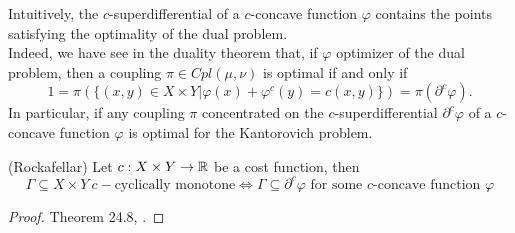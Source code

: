 \documentclass[../main.tex]{subfiles}
\begin{document}
\begin{remark}
    Intuitively, the $c$-superdifferential of a $c$-concave function $\varphi$ contains the points satisfying the optimality of the dual problem.\\Indeed, we have see in the duality theorem that, if $\varphi$ optimizer of the dual problem, then a coupling $\pi\in Cpl(\mu, \nu)$ is optimal if and only if 
    $$
    1= \pi(\{(x, y)\in X\times Y | \varphi(x) + \varphi^c(y) = c(x, y)\}) = \pi(\partial^c\varphi).
    $$
    In particular, if any coupling $\pi$ concentrated on the $c$-superdifferential $\partial^c \varphi$ of a $c$-concave function $\varphi$ is optimal for the Kantorovich problem.
\end{remark}

\begin{theorem}
    \label{thm:Rockafellar}
    (Rockafellar) 
    Let $c: X\times Y \to \mathbb{R}$ be a cost function, then 
    $$\Gamma\subseteq X\times Y \ c - \text{cyclically monotone} \iff \Gamma \subseteq \partial^c \varphi \text{ for some $c$-concave function $\varphi$}$$
\end{theorem}
\begin{proof}
    Theorem 24.8, \cite{rockafellar1997convex}.
\end{proof}
\end{document}
